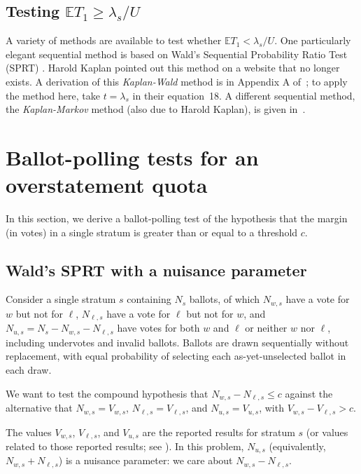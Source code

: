 \documentclass[runningheads]{llncs}
\begin{document}
\subsection{Testing $\mathbb{E} T_1 \ge \lambda_s/U$}

A variety of methods are available to test whether $\mathbb{E} T_1 < \lambda_s/U$.
One particularly elegant sequential method is based on Wald's Sequential Probability
Ratio Test (SPRT) \cite{wald45}.
Harold Kaplan pointed out this method on a website that no longer exists.
A derivation of this \emph{Kaplan-Wald} method is in Appendix A of~\cite{starkTeague14};
to apply the method here, take $t = \lambda_s$ in their equation~18.
A different sequential method, the \emph{Kaplan-Markov} method (also due to Harold Kaplan), 
is given in~\cite{stark09b}.


\section{Ballot-polling tests for an overstatement quota}\label{sec:appendix-polling}
In this section, we derive a ballot-polling test of the hypothesis that the margin (in votes) in a single stratum is greater than or equal to a threshold $c$. 

\subsection{Wald's SPRT with a nuisance parameter}

Consider a single stratum $s$ containing $N_s$ ballots, of which 
$N_{w,s}$ have a vote for $w$ but not for $\ell$, $N_{\ell,s}$ have a vote for $\ell$ but not for $w$, and $N_{u,s} = N_s - N_{w,s} - N_{\ell,s}$ have votes for both $w$ and $\ell$ or neither $w$ nor $\ell$, including undervotes and invalid ballots.
Ballots are drawn sequentially without replacement, with equal probability of selecting each as-yet-unselected ballot in each draw.

We want to test the compound hypothesis that $N_{w,s} - N_{\ell,s} \le c$ against the alternative that $N_{w,s} = V_{w,s}$, $N_{\ell,s} = V_{\ell,s}$, and $N_{u,s} = V_{u,s}$, with $V_{w,s} - V_{\ell,s} > c$.

The values $V_{w,s}$, $V_{\ell,s}$, and $V_{u,s}$ are the reported results for stratum $s$ 
(or values related to those reported results; see \cite{lindemanEtal12}). 
In this problem, $N_{u,s}$ (equivalently, $N_{w,s} + N_{\ell,s}$) is a nuisance parameter: we care about $ N_{w,s} - N_{\ell,s}$.
\end{document}

